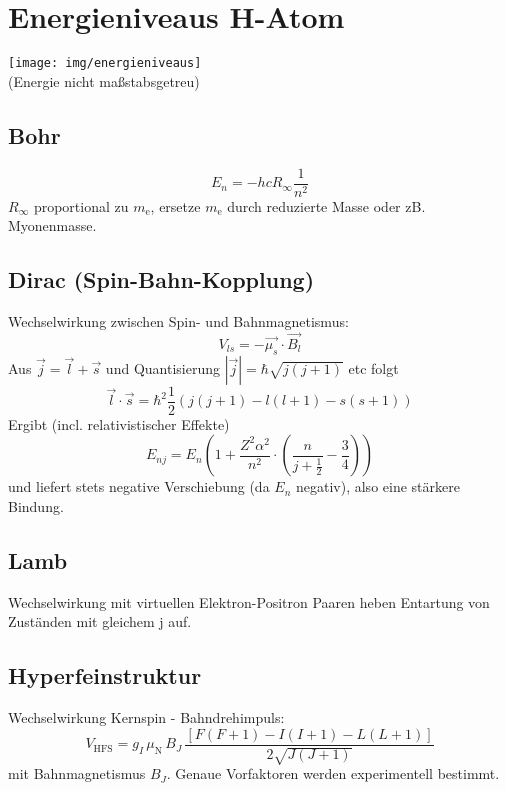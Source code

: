 \section{Energieniveaus H-Atom}
\begin{center}
	\texttt{[image: img/energieniveaus]}\\
	(Energie nicht maßstabsgetreu)
\end{center}

\subsection{Bohr}
\begin{equation*}
	E_n = -hc R_\infty \frac{1}{n^2}
\end{equation*}
$R_\infty$ proportional zu $m_\text{e}$, ersetze $m_\text{e}$ durch reduzierte Masse oder zB. Myonenmasse.

\subsection{Dirac (Spin-Bahn-Kopplung)}
Wechselwirkung zwischen Spin- und Bahnmagnetismus:
\begin{equation*}
	V_{ls} = -\vec{\mu_s} \cdot \vec{B_l}
\end{equation*}
Aus $\vec{j} = \vec{l} + \vec{s}$ und Quantisierung $|\vec{j}| = \hbar \sqrt{j(j+1)}$ etc folgt
\begin{equation*}
	\vec{l} \cdot \vec{s} = \hbar^2 \frac{1}{2}\left(j(j+1)-l(l+1)-s(s+1)\right)
\end{equation*}
Ergibt (incl. relativistischer Effekte)
\begin{equation*}
	E_{nj} = E_n \left(1 + \frac{Z^2 \alpha^2}{n^2} \cdot \left(\frac{n}{j+\frac{1}{2}} - \frac{3}{4} \right)\right)
\end{equation*}
und liefert stets negative Verschiebung (da $E_n$ negativ), also eine stärkere Bindung.

\subsection{Lamb}
Wechselwirkung mit virtuellen Elektron-Positron Paaren heben Entartung von Zuständen mit gleichem j auf.

\subsection{Hyperfeinstruktur}
Wechselwirkung Kernspin - Bahndrehimpuls:
\begin{equation*}
	V_\text{HFS} = g_I \, \mu_\text{N} \, B_J \, \frac{\left[F(F+1)-I(I+1)-L(L+1)\right]}{2 \sqrt{J(J+1)}}
\end{equation*}
mit Bahnmagnetismus $B_J$.
Genaue Vorfaktoren werden experimentell bestimmt.
